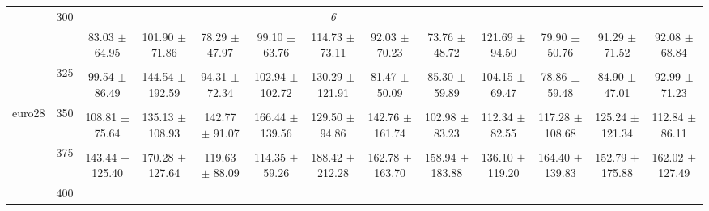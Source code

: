 \begin{table}[h]
{\begin{tabular}{
        ccccccccccccc}
 & \multirow{2}{*}{300}& & & & & \textit{ 6 }& & & & & &  \\ 
 & & 83.03 $\pm$ 64.95& 101.90 $\pm$ 71.86& 78.29 $\pm$ 47.97& 99.10 $\pm$ 63.76& 114.73 $\pm$ 73.11& 92.03 $\pm$ 70.23& 73.76 $\pm$ 48.72& 121.69 $\pm$ 94.50& 79.90 $\pm$ 50.76& 91.29 $\pm$ 71.52& 92.08 $\pm$ 68.84 \\ 
 & \multirow{2}{*}{325}& \cellcolor[HTML]{EFEFEF} & \cellcolor[HTML]{EFEFEF} & \cellcolor[HTML]{EFEFEF} & \cellcolor[HTML]{EFEFEF} & \cellcolor[HTML]{EFEFEF} & \cellcolor[HTML]{EFEFEF} & \cellcolor[HTML]{EFEFEF} & \cellcolor[HTML]{EFEFEF} & \cellcolor[HTML]{EFEFEF} & \cellcolor[HTML]{EFEFEF} & \cellcolor[HTML]{EFEFEF}  \\ 
 & & \cellcolor[HTML]{EFEFEF} 99.54 $\pm$ 86.49& \cellcolor[HTML]{EFEFEF} 144.54 $\pm$ 192.59& \cellcolor[HTML]{EFEFEF} 94.31 $\pm$ 72.34& \cellcolor[HTML]{EFEFEF} 102.94 $\pm$ 102.72& \cellcolor[HTML]{EFEFEF} 130.29 $\pm$ 121.91& \cellcolor[HTML]{EFEFEF} 81.47 $\pm$ 50.09& \cellcolor[HTML]{EFEFEF} 85.30 $\pm$ 59.89& \cellcolor[HTML]{EFEFEF} 104.15 $\pm$ 69.47& \cellcolor[HTML]{EFEFEF} 78.86 $\pm$ 59.48& \cellcolor[HTML]{EFEFEF} 84.90 $\pm$ 47.01& \cellcolor[HTML]{EFEFEF} 92.99 $\pm$ 71.23 \\ 
 \multirow{4}{*}{euro28} & \multirow{2}{*}{350}& & & & & & & & & & &  \\ 
 & & 108.81 $\pm$ 75.64& 135.13 $\pm$ 108.93& 142.77 $\pm$ 91.07& 166.44 $\pm$ 139.56& 129.50 $\pm$ 94.86& 142.76 $\pm$ 161.74& 102.98 $\pm$ 83.23& 112.34 $\pm$ 82.55& 117.28 $\pm$ 108.68& 125.24 $\pm$ 121.34& 112.84 $\pm$ 86.11 \\ 
 & \multirow{2}{*}{375}& \cellcolor[HTML]{EFEFEF} & \cellcolor[HTML]{EFEFEF} & \cellcolor[HTML]{EFEFEF} & \cellcolor[HTML]{EFEFEF} & \cellcolor[HTML]{EFEFEF} & \cellcolor[HTML]{EFEFEF} & \cellcolor[HTML]{EFEFEF} & \cellcolor[HTML]{EFEFEF} & \cellcolor[HTML]{EFEFEF} & \cellcolor[HTML]{EFEFEF} & \cellcolor[HTML]{EFEFEF}  \\ 
 & & \cellcolor[HTML]{EFEFEF} 143.44 $\pm$ 125.40& \cellcolor[HTML]{EFEFEF} 170.28 $\pm$ 127.64& \cellcolor[HTML]{EFEFEF} 119.63 $\pm$ 88.09& \cellcolor[HTML]{EFEFEF} 114.35 $\pm$ 59.26& \cellcolor[HTML]{EFEFEF} 188.42 $\pm$ 212.28& \cellcolor[HTML]{EFEFEF} 162.78 $\pm$ 163.70& \cellcolor[HTML]{EFEFEF} 158.94 $\pm$ 183.88& \cellcolor[HTML]{EFEFEF} 136.10 $\pm$ 119.20& \cellcolor[HTML]{EFEFEF} 164.40 $\pm$ 139.83& \cellcolor[HTML]{EFEFEF} 152.79 $\pm$ 175.88& \cellcolor[HTML]{EFEFEF} 162.02 $\pm$ 127.49 \\ 
 & \multirow{2}{*}{400}& & & & & & & & & & &  \\ 

\end{tabular}}
\end{table}
